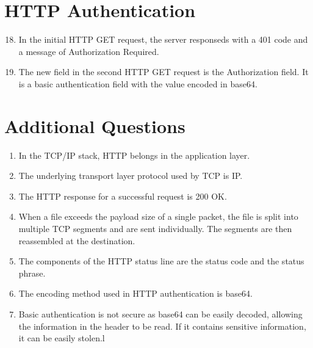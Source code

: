 \documentclass{article}
\begin{document}
\section{HTTP Authentication}

\begin{enumerate}
    \setcounter{enumi}{17}
    \item In the initial HTTP GET request, the server responseds with a 401 code and a message of Authorization Required. 
    \item The new field in the second HTTP GET request is the Authorization field. It is a basic authentication field with the value encoded in base64.
\end{enumerate}

\section{Additional Questions}
\begin{enumerate}
    \item In the TCP/IP stack, HTTP belongs in the application layer.
    \item The underlying transport layer protocol used by TCP is IP.
    \item The HTTP response for a successful request is 200 OK.
    \item When a file exceeds the payload size of a single packet, the file is split into multiple TCP segments and are sent individually. The segments are then reassembled at the destination.
    \item The components of the HTTP status line are the status code and the status phrase.
    \item The encoding method used in HTTP authentication is base64.
    \item Basic authentication is not secure as base64 can be easily decoded, allowing the information in the header to be read. If it contains sensitive information, it can be easily stolen.l
\end{enumerate}

\end{document}
